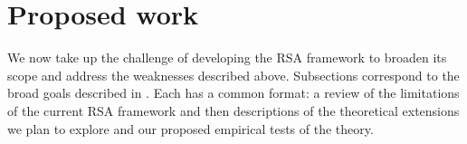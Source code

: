 \section{Proposed work}
\label{sec:proposed}

We now take up the challenge of developing the RSA framework to
broaden its scope and address the weaknesses described above.
Subsections correspond to the broad goals described in
. Each has a common format: a review of the
limitations of the current RSA framework and then descriptions of the
theoretical extensions we plan to explore and our proposed empirical
tests of the theory.

%


